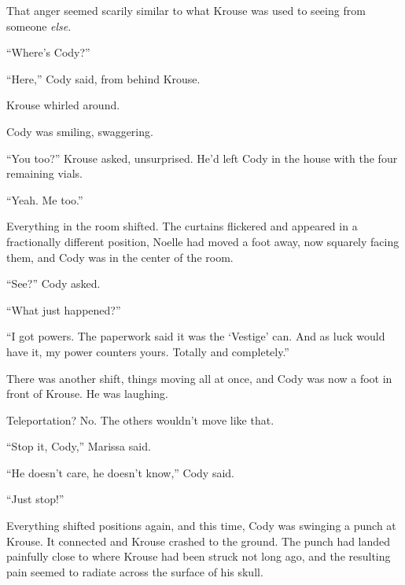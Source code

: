 That anger seemed scarily similar to what Krouse was used to seeing from someone \emph{else}.



``Where's Cody?''



``Here,'' Cody said, from behind Krouse.



Krouse whirled around.



Cody was smiling, swaggering.



``You too?'' Krouse asked, unsurprised.  He'd left Cody in the house with the four remaining vials.



``Yeah.  Me too.''



Everything in the room shifted.  The curtains flickered and appeared in a fractionally different position, Noelle had moved a foot away, now squarely facing them, and Cody was in the center of the room.



``See?'' Cody asked.



``What just happened?''



``I got powers.  The paperwork said it was the `Vestige' can.  And as luck would have it, my power counters yours.  Totally and completely.''



There was another shift, things moving all at once, and Cody was now a foot in front of Krouse.  He was laughing.



Teleportation?  No.  The others wouldn't move like that.



``Stop it, Cody,'' Marissa said.



``He doesn't care, he doesn't know,'' Cody said.



``Just stop!''



Everything shifted positions again, and this time, Cody was swinging a punch at Krouse.  It connected and Krouse crashed to the ground.  The punch had landed painfully close to where Krouse had been struck not long ago, and the resulting pain seemed to radiate across the surface of his skull.



